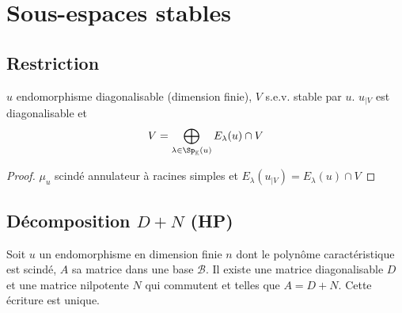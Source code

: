 \section{Sous-espaces stables}

\subsection{Restriction}

\begin{prop}
    \Hyp $u$ endomorphisme diagonalisable (dimension finie), $V$ s.e.v. stable par $u$.
    \Conc $u_{|V}$ est diagonalisable et \[
        V=\bigoplus_{\lambda\in\Sp_{\mathbb K}(u)}E_\lambda(u)\cap V
    \]
\end{prop}

\begin{proof}
    $\mu_u$ scindé annulateur à racines simples et $E_\lambda(u_{|V})=E_\lambda(u)\cap V$
\end{proof}

\subsection{Décomposition $D+N$ (HP)}

\begin{res}
    Soit $u$ un endomorphisme en dimension finie $n$ dont le polynôme caractéristique est scindé, $A$ sa matrice dans une base $\mathcal B$. Il existe une matrice diagonalisable $D$ et une matrice nilpotente $N$ qui commutent et telles que $A=D+N$. Cette écriture est unique.
\end{res}

